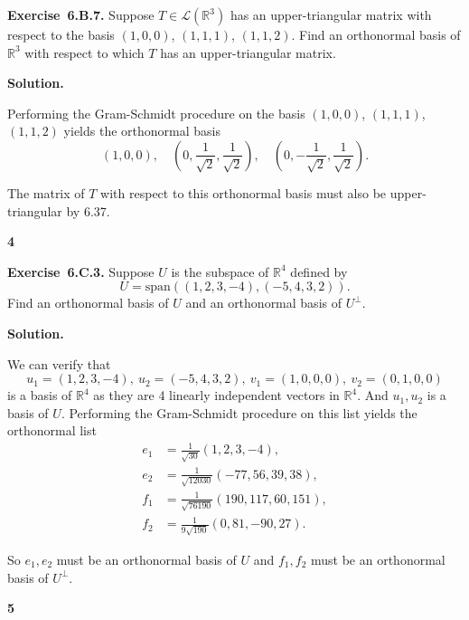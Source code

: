 \documentclass[11pt]{article}
\newcommand{\ProblemDivider}[1]{%
  \vspace{1.0em}
  \noindent\textbf{#1}\par
  \vspace{0.35em}
}
\newcommand{\ProblemAnnounce}{\noindent}
\newcommand{\SolutionAnnounce}{\noindent\textbf{Solution.}\par\medskip}
\newcommand{\Exercise}[1]{\textbf{Exercise~#1.}\;}
\newcommand{\R}{\mathbb{R}}
\newcommand{\<}{\langle}
\renewcommand{\>}{\rangle}
\begin{document}
\begin{problemBox}
\ProblemAnnounce
\Exercise{6.B.7}
Suppose $T \in \mathcal{L}(\R^3)$ has an upper-triangular matrix with respect to
the basis $(1, 0, 0)$, $(1, 1, 1)$, $(1, 1, 2)$. Find an orthonormal basis of $\R^3$ with respect to
which $T$ has an upper-triangular matrix.
\end{problemBox}

\begin{solutionBox}
\SolutionAnnounce
\doublespacing

Performing the Gram-Schmidt procedure on the basis $(1, 0, 0)$, $(1, 1, 1)$, $(1, 1, 2)$
yields the orthonormal basis
\[\left(1, 0, 0\right),\quad \left(0, \frac{1}{\sqrt{2}}, \frac{1}{\sqrt{2}}\right),\quad \left(0, -\frac{1}{\sqrt{2}}, \frac{1}{\sqrt{2}}\right).\]

The matrix of $T$ with respect to this orthonormal basis must also
be upper-triangular by 6.37.
\end{solutionBox}

\ProblemDivider{4}

\begin{problemBox}
\ProblemAnnounce
\Exercise{6.C.3}
Suppose $U$ is the subspace of $\R^4$ defined by
\[U = \text{span}((1, 2, 3, -4), (-5, 4, 3, 2)).\]
Find an orthonormal basis of $U$ and an orthonormal basis of $U^\perp$.
\end{problemBox}

\begin{solutionBox}
\SolutionAnnounce
\doublespacing

We can verify that
\[u_1 = (1, 2, 3, -4),\ u_2 = (-5, 4, 3, 2),\ v_1 = (1, 0, 0, 0),\ v_2 = (0, 1, 0, 0)\]
is a basis of $\R^4$ as they are 4 linearly independent vectors in $\R^4$. And $u_1, u_2$ is a basis of $U$. Performing the Gram-Schmidt procedure
on this list yields the orthonormal list
\[
\begin{aligned}
e_1 &= \frac{1}{\sqrt{30}}(1, 2, 3, -4),\\
e_2 &= \frac{1}{\sqrt{12030}}(-77, 56, 39, 38),\\
f_1 &= \frac{1}{\sqrt{76190}}(190, 117, 60, 151),\\
f_2 &= \frac{1}{9\sqrt{190}}(0, 81, -90, 27).
\end{aligned}
\]

So $e_1, e_2$ must be an orthonormal basis of $U$ and $f_1, f_2$ must
be an orthonormal basis of $U^\perp$.
\end{solutionBox}

\ProblemDivider{5}
\end{document}
